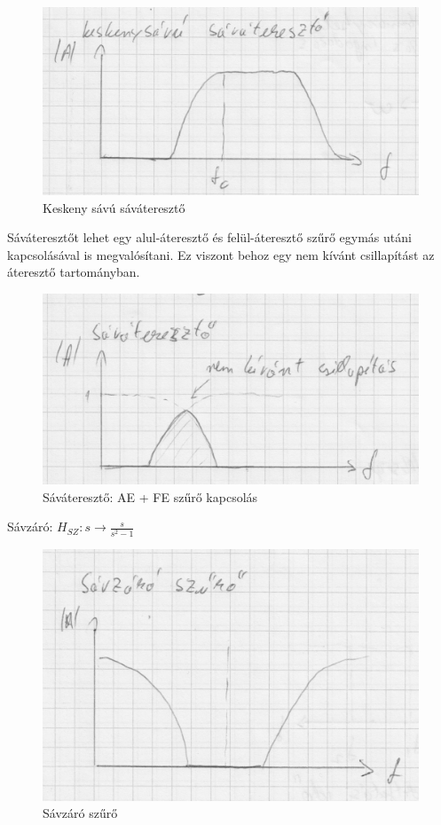 \begin{figure}[H]
    \centering
    \includegraphics[scale=0.2]{figures/szuro_bp_good.jpg}
    \caption{Keskeny sávú sáváteresztő}
\end{figure}

Sáváteresztőt lehet egy alul-áteresztő és felül-áteresztő szűrő egymás utáni kapcsolásával is megvalósítani. Ez viszont behoz egy nem kívánt csillapítást az áteresztő tartományban.

\begin{figure}[H]
    \centering
    \includegraphics[scale=0.2]{figures/szuro_bp.jpg}
    \caption{Sáváteresztő: AE + FE szűrő kapcsolás}
\end{figure}

Sávzáró: $H_{SZ}: s \rightarrow \frac{s}{s^{2} - 1}$

\begin{figure}[H]
    \centering
    \includegraphics[scale=0.2]{figures/szuro_bs.jpg}
    \caption{Sávzáró szűrő}
\end{figure}
